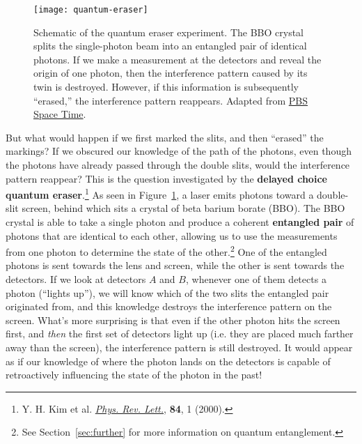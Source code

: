 \begin{figure}[!h]
	\centering
	\texttt{[image: quantum-eraser]}
	\caption{Schematic of the quantum eraser experiment. The BBO crystal splits the single-photon beam into an entangled pair of identical photons. If we make a measurement at the detectors and reveal the origin of one photon, then the interference pattern caused by its twin is destroyed. However, if this information is subsequently ``erased,'' the interference pattern reappears. Adapted from \href{http://www.pbs.org/video/2365862119/}{PBS Space Time}.}
	\label{fig:QE}
\end{figure}

But what would happen if we first marked the slits, and then ``erased'' the markings? If we obscured our knowledge of the path of the photons, even though the photons have already passed through the double slits, would the interference pattern reappear? This is the question investigated by the \textbf{delayed choice quantum eraser}.\footnote{Y. H. Kim et al. \href{https://journals.aps.org/prl/abstract/10.1103/PhysRevLett.84.1}{\emph{Phys. Rev. Lett.}}, \textbf{84}, 1 (2000).} As seen in Figure~\ref{fig:QE}, a laser emits photons toward a double-slit screen, behind which sits a crystal of beta barium borate (BBO). The BBO crystal is able to take a single photon and produce a coherent \textbf{entangled pair} of photons that are identical to each other, allowing us to use the measurements from one photon to determine the state of the other.\footnote{See Section~\ref{sec:further} for more information on quantum entanglement.} One of the entangled photons is sent towards the lens and screen, while the other is sent towards the detectors. If we look at detectors $A$ and $B$, whenever one of them detects a photon (``lights up''), we will know which of the two slits the entangled pair originated from, and this knowledge destroys the interference pattern on the screen. What's more surprising is that even if the other photon hits the screen first, and \emph{then} the first set of detectors light up (i.e. they are placed much farther away than the screen), the interference pattern is still destroyed. It would appear as if our knowledge of where the photon lands on the detectors is capable of retroactively influencing the state of the photon in the past! \par


